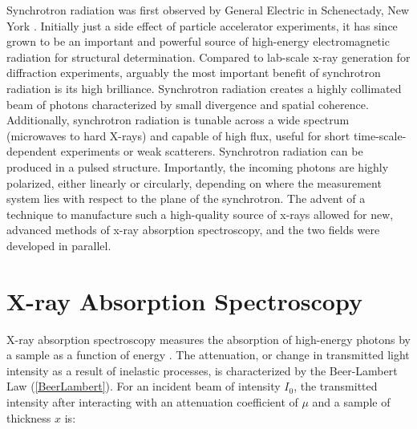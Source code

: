 

Synchrotron radiation was first observed by General Electric in Schenectady, New York \cite{firstSynchrotronRadPaper}. Initially just a side effect of particle accelerator experiments, it has since grown to be an important and powerful source of high-energy electromagnetic radiation for structural determination. Compared to lab-scale x-ray generation for diffraction experiments, arguably the most important benefit of synchrotron radiation is its high brilliance. Synchrotron radiation creates a highly collimated beam of photons characterized by small divergence and spatial coherence. Additionally, synchrotron radiation is tunable across a wide spectrum (microwaves to hard X-rays) and capable of high flux, useful for short time-scale-dependent experiments or weak scatterers. Synchrotron radiation can be produced in a pulsed structure. Importantly, the incoming photons are highly polarized, either linearly or circularly, depending on where the measurement system lies with respect to the plane of the synchrotron. The advent of a technique to manufacture such a high-quality source of x-rays allowed for new, advanced methods of x-ray absorption spectroscopy, and the two fields were developed in parallel. 

\section{X-ray Absorption Spectroscopy}
X-ray absorption spectroscopy measures the absorption of high-energy photons by a sample as a function of energy \cite{gardenghi2012synchrotron}. The attenuation, or change in transmitted light intensity as a result of inelastic processes, is characterized by the Beer-Lambert Law (\ref{BeerLambert}). For an incident beam of intensity $I_0$, the transmitted intensity after interacting with an attenuation
coefficient of $ \mu $ and a sample of thickness $ x $ is: 

